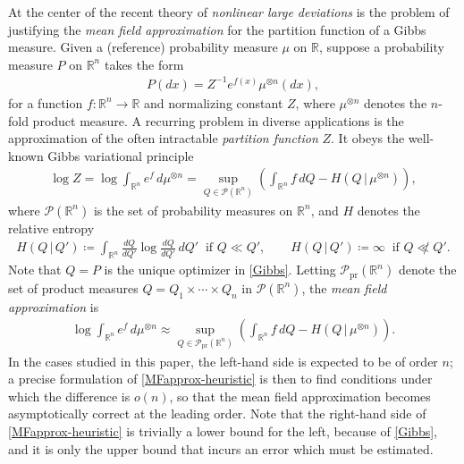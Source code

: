 \documentclass[11pt,reqno]{amsart}
\numberwithin{equation}{section}
\theoremstyle{definition}
\def\R{{\mathbb R}}
\def\P{{\mathcal P}}
\def\Pprod{\P_{\mathrm{pr}}}
\begin{document}
  At the center of the recent theory of \emph{nonlinear large deviations} is the problem of justifying the \emph{mean field approximation} for the partition function of a Gibbs measure. Given a (reference) probability measure $\mu$ on $\R$, suppose a probability measure $P$ on $\R^n$ takes the form
\begin{align*}
	 P(dx) = Z^{-1} e^{f(x)}\mu^{\otimes n}(dx),
\end{align*}
for a function $f : \R^n \to \R$ and normalizing constant $Z$, where $\mu^{\otimes n}$ denotes the $n$-fold product measure. A recurring problem in diverse applications is the approximation of the often intractable \emph{partition function} $Z$. It obeys the well-known Gibbs variational principle 
\begin{align}
	\log Z = \log \int_{\R^n} e^f\,d\mu^{\otimes n} = \sup_{Q \in \P(\R^n)} \left( \int_{\R^n} f\,dQ - H(Q\,|\,\mu^{\otimes n})\right), \label{Gibbs}
\end{align}
where $\P(\R^n)$ is the set of probability measures on $\R^n$, and $H$ denotes the relative entropy
\begin{align*}
	H(Q\,|\,Q') \coloneqq \int_{\R^n} \frac{dQ}{dQ'}\log\frac{dQ}{dQ'}\,dQ' \  \text{ if } Q \ll Q', \qquad H(Q\,|\,Q') \coloneqq \infty \ \text{ if } Q \not\ll Q'.
\end{align*}
Note that $Q=P$ is the unique optimizer in \eqref{Gibbs}.
Letting $\Pprod(\R^n)$ denote the set of product measures $Q = Q_1 \times \cdots \times Q_n$ in $\P(\R^n)$, the \emph{mean field approximation} is
\begin{align}
	\log \int_{\R^n} e^f\,d\mu^{\otimes n} \approx \sup_{Q \in \Pprod(\R^n)} \left( \int_{\R^n} f\,dQ - H(Q\,|\,\mu^{\otimes n})\right). \label{MFapprox-heuristic}
\end{align}
In the cases studied in this paper, the left-hand side is expected to be of order $n$; a precise formulation of \eqref{MFapprox-heuristic} is then to find conditions under which the difference is $o(n)$, so that the mean field approximation becomes asymptotically correct at the leading order. Note that the right-hand side of  \eqref{MFapprox-heuristic} is trivially a lower bound for the left, because of \eqref{Gibbs}, and it is only the upper bound that incurs an error which must be estimated.
\end{document}
